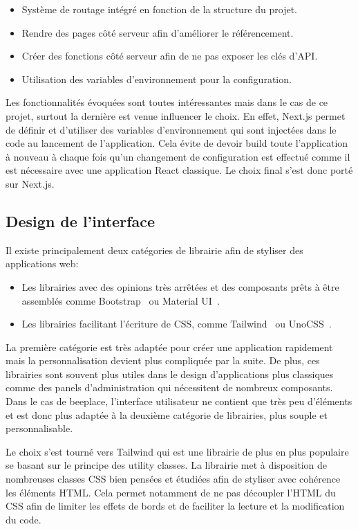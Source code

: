 \begin{itemize}
  \item Système de routage intégré en fonction de la structure du projet.
  \item Rendre des pages côté serveur afin d'améliorer le référencement.
  \item Créer des fonctions côté serveur afin de ne pas exposer les clés d'API.
  \item Utilisation des variables d'environnement pour la configuration.
\end{itemize}

Les fonctionnalités évoquées sont toutes intéressantes mais dans le cas de ce projet, surtout la dernière est venue influencer le choix. En effet, Next.js permet de définir et d'utiliser des variables d'environnement qui sont injectées dans le code au lancement de l'application. Cela évite de devoir build toute l'application à nouveau à chaque fois qu'un changement de configuration est effectué comme il est nécessaire avec une application React classique. Le choix final s'est donc porté sur Next.js.

\subsection{Design de l'interface}

Il existe principalement deux catégories de librairie afin de styliser des applications web:

\begin{itemize}
  \item Les librairies avec des opinions très arrêtées et des composants prêts à être assemblés comme Bootstrap~\cite{bootstrap} ou Material UI~\cite{mui}.
  \item Les librairies facilitant l'écriture de CSS, comme Tailwind~\cite{tailwindcss} ou UnoCSS~\cite{unocss}.
\end{itemize}

La première catégorie est très adaptée pour créer une application rapidement mais la personnalisation devient plus compliquée par la suite. De plus, ces librairies sont souvent plus utiles dans le design d'applications plus classiques comme des panels d'administration qui nécessitent de nombreux composants. Dans le cas de \gls{beeplace}, l'interface utilisateur ne contient que très peu d'éléments et est donc plus adaptée à la deuxième catégorie de librairies, plus souple et personnalisable.

Le choix s'est tourné vers Tailwind qui est une librairie de plus en plus populaire se basant sur le principe des utility classes. La librairie met à disposition de nombreuses classes CSS bien pensées et étudiées afin de styliser avec cohérence les éléments HTML. Cela permet notamment de ne pas découpler l'HTML du CSS afin de limiter les effets de bords et de faciliter la lecture et la modification du code.

